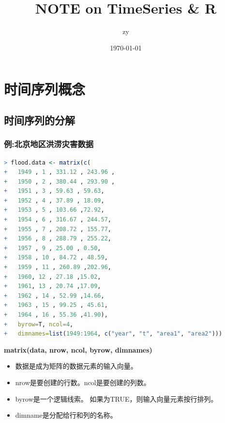 \documentclass[11pt,a4paper,oneside]{book}
\title{\huge NOTE on TimeSeries \& R}
\author{zy}
\date{\today}
\begin{document}
	\maketitle
	\tableofcontents  %

\chapter{时间序列概念}
\section{时间序列的分解}
\subsection{例:北京地区洪涝灾害数据}

\begin{lstlisting}[language=r]
> flood.data <- matrix(c(
+   1949 , 1 , 331.12 , 243.96 , 
+   1950 , 2 , 380.44 , 293.90 , 
+   1951 , 3 , 59.63 , 59.63,
+   1952 , 4 , 37.89 , 18.09,
+   1953 , 5 , 103.66 ,72.92,
+   1954 , 6 , 316.67 , 244.57,
+   1955 , 7 , 208.72 , 155.77,
+   1956 , 8 , 288.79 , 255.22,
+   1957 , 9 , 25.00 , 0.50,
+   1958 , 10 , 84.72 , 48.59,
+   1959 , 11 , 260.89 ,202.96,
+   1960, 12 , 27.18 ,15.02,
+   1961, 13 , 20.74 ,17.09,
+   1962 , 14 , 52.99 ,14.66,
+   1963 , 15 , 99.25 , 45.61,
+   1964 , 16 , 55.36 ,41.90),
+   byrow=T, ncol=4,
+   dimnames=list(1949:1964, c("year", "t", "area1", "area2")))
\end{lstlisting}
\begin{tcolorbox}[colback=pink!10!white,colframe=pink!100!black]
\textbf{matrix(data, nrow, ncol, byrow, dimnames)}
\begin{itemize}
	\item 数据是成为矩阵的数据元素的输入向量。
	\item nrow是要创建的行数。ncol是要创建的列数。
	\item byrow是一个逻辑线索。 如果为TRUE，则输入向量元素按行排列。
	\item dimname是分配给行和列的名称。
\end{itemize}
\end{tcolorbox}
\end{document}
